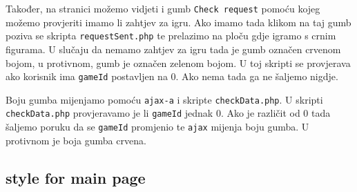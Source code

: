 \documentclass{article}
\begin{document}
Također, na stranici možemo vidjeti i gumb \verb|Check request| pomoću kojeg možemo provjeriti imamo li zahtjev za igru. Ako imamo tada klikom na taj gumb poziva se skripta \verb|requestSent.php| te prelazimo na ploču gdje igramo s crnim figurama. U slučaju da nemamo zahtjev za igru tada je gumb označen crvenom bojom, u protivnom, gumb je označen zelenom bojom. U toj skripti se provjerava ako korisnik ima \verb|gameId| postavljen na $0$. Ako nema tada ga ne šaljemo nigdje. 

Boju gumba mijenjamo pomoću \verb|ajax-a| i skripte \verb|checkData.php|. U skripti \verb|checkData.php| provjeravamo je li \verb|gameId| jednak $0$. Ako je različit od $0$ tada šaljemo poruku da se \verb|gameId| promjenio te \verb|ajax| mijenja boju gumba. U protivnom je boja gumba crvena.

\subsection{style for main page}
\end{document}
